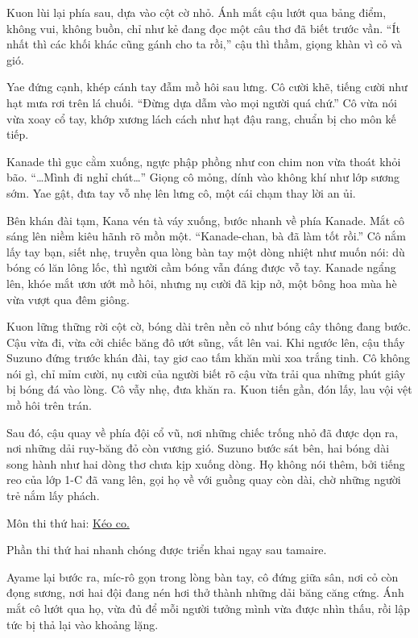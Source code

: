 \documentclass[../main.tex]{subfiles}
\begin{document}
Kuon lùi lại phía sau, dựa vào cột cờ nhỏ. Ánh mắt cậu lướt qua bảng điểm, không vui, không buồn, chỉ như kẻ đang đọc một câu thơ đã biết trước vần. ``Ít nhất thì các khối khác cũng gánh cho ta rồi,'' cậu thì thầm, giọng khàn vì cỏ và gió.

Yae đứng cạnh, khép cánh tay đẫm mồ hôi sau lưng. Cô cười khẽ, tiếng cười như hạt mưa rơi trên lá chuối. ``Đừng dựa dẫm vào mọi người quá chứ.'' Cô vừa nói vừa xoay cổ tay, khớp xương lách cách như hạt đậu rang, chuẩn bị cho môn kế tiếp.

Kanade thì gục cằm xuống, ngực phập phồng như con chim non vừa thoát khỏi bão. ``\dots Mình đi nghỉ chút\dots'' Giọng cô mỏng, dính vào không khí như lớp sương sớm. Yae gật, đưa tay vỗ nhẹ lên lưng cô, một cái chạm thay lời an ủi.

Bên khán đài tạm, Kana vén tà váy xuống, bước nhanh về phía Kanade. Mắt cô sáng lên niềm kiêu hãnh rõ mồn một. ``Kanade-chan, bà đã làm tốt rồi.'' Cô nắm lấy tay bạn, siết nhẹ, truyền qua lòng bàn tay một dòng nhiệt như muốn nói: dù bóng có lăn lông lốc, thì người cầm bóng vẫn đáng được vỗ tay. Kanade ngẩng lên, khóe mắt ươn ướt mồ hôi, nhưng nụ cười đã kịp nở, một bông hoa mùa hè vừa vượt qua đêm giông.

Kuon lững thững rời cột cờ, bóng dài trên nền cỏ như bóng cây thông đang bước. Cậu vừa đi, vừa cởi chiếc băng đô ướt sũng, vắt lên vai. Khi ngước lên, cậu thấy Suzuno đứng trước khán đài, tay giơ cao tấm khăn mùi xoa trắng tinh. Cô không nói gì, chỉ mỉm cười, nụ cười của người biết rõ cậu vừa trải qua những phút giây bị bóng đá vào lòng. Cô vẫy nhẹ, đưa khăn ra. Kuon tiến gần, đón lấy, lau vội vệt mồ hôi trên trán.

Sau đó, cậu quay về phía đội cổ vũ, nơi những chiếc trống nhỏ đã được dọn ra, nơi những dải ruy-băng đỏ còn vương gió. Suzuno bước sát bên, hai bóng dài song hành như hai dòng thơ chưa kịp xuống dòng. Họ không nói thêm, bởi tiếng reo của lớp 1-C đã vang lên, gọi họ về với guồng quay còn dài, chờ những người trẻ nắm lấy phách.

\begin{center}
  {\color{vol} Môn thi thứ hai: \uline{Kéo co.}}
\end{center}

Phần thi thứ hai nhanh chóng được triển khai ngay sau tamaire.

Ayame lại bước ra, míc-rô gọn trong lòng bàn tay, cô đứng giữa sân, nơi cỏ còn đọng sương, nơi hai đội đang nén hơi thở thành những dải băng căng cứng. Ánh mắt cô lướt qua họ, vừa đủ để mỗi người tưởng mình vừa được nhìn thấu, rồi lập tức bị thả lại vào khoảng lặng.
\end{document}
